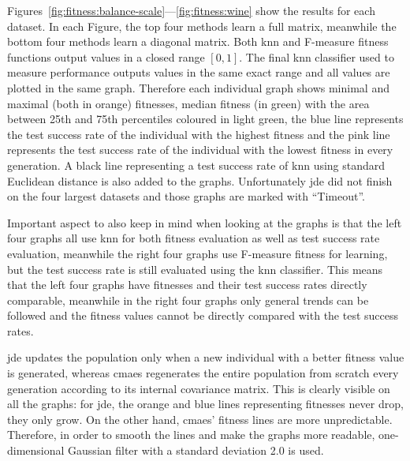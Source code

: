 Figures~\ref{fig:fitness:balance-scale}---\ref{fig:fitness:wine} show the results for each dataset. In each Figure, the top four methods learn a full matrix, meanwhile the bottom four methods learn a diagonal matrix. Both \ac{knn} and \mbox{F-measure} fitness functions output values in a closed range $[0,1]$. The final \ac{knn} classifier used to measure performance outputs values in the same exact range and all values are plotted in the same graph. Therefore each individual graph shows minimal and maximal (both in orange) fitnesses, median fitness (in green) with the area between 25th and 75th percentiles coloured in light green, the blue line represents the test success rate of the individual with the highest fitness and the pink line represents the test success rate of the individual with the lowest fitness in every generation. A black line representing a test success rate of \ac{knn} using standard Euclidean distance is also added to the graphs. Unfortunately \ac{jde} did not finish on the four largest datasets and those graphs are marked with ``Timeout''.

Important aspect to also keep in mind when looking at the graphs is that the left four graphs all use \ac{knn} for both fitness evaluation as well as test success rate evaluation, meanwhile the right four graphs use \mbox{F-measure} fitness for learning, but the test success rate is still evaluated using the \ac{knn} classifier. This means that the left four graphs have fitnesses and their test success rates directly comparable, meanwhile in the right four graphs only general trends can be followed and the fitness values cannot be directly compared with the test success rates.

\ac{jde} updates the population only when a new individual with a better fitness value is generated, whereas \ac{cmaes} regenerates the entire population from scratch every generation according to its internal covariance matrix. This is clearly visible on all the graphs: for \ac{jde}, the orange and blue lines representing fitnesses never drop, they only grow. On the other hand, \ac{cmaes}' fitness lines are more unpredictable. Therefore, in order to smooth the lines and make the graphs more readable, one-dimensional Gaussian filter with a standard deviation 2.0 is used.

